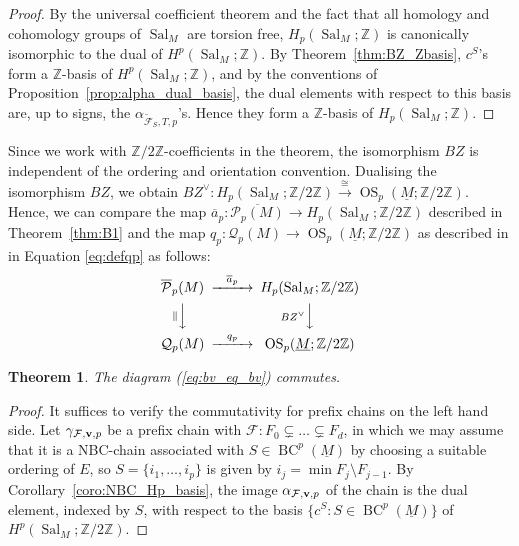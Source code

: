 \documentclass{amsart}
\newtheorem{theorem}{Theorem}[section]
\newcommand\Fcal{{\mathcal F}}
\newcommand\Qcal{{\mathcal Q}}
\newcommand\Pcal{{\mathcal P}}
\newcommand\vv{{\bf v}}
\newcommand\ZZ{{\mathbb Z}}
\newcommand\Ztwo{{\mathbb Z}/2{\mathbb Z}}
\newcommand\qbv{{q}}
\newcommand\abv{{a}}
\DeclareMathOperator{\Sal}{Sal}
\DeclareMathOperator{\OS}{OS}
\DeclareMathOperator{\BC}{BC}
\begin{document}
{\begin{proof}
By the universal coefficient theorem and the fact that all homology and cohomology groups of $\Sal_M$ are torsion free, $H_p(\Sal_M;\ZZ)$ is canonically isomorphic to the dual of $H^p(\Sal_M;\ZZ)$.
By Theorem~\ref{thm:BZ_Zbasis}, $c^S$'s form a $\ZZ$-basis of $H^p(\Sal_M;\ZZ)$, and by the conventions of Proposition~\ref{prop:alpha_dual_basis}, the dual elements with respect to this basis are, up to signs, the $\alpha_{\tilde{\Fcal}_S,T,p}$'s. Hence they form a $\ZZ$-basis of $H_p(\Sal_M;\ZZ)$.
\end{proof}

Since we work with $\Ztwo$-coefficients in the theorem, the isomorphism $BZ$ is independent of the ordering and orientation convention.
Dualising the isomorphism $BZ$, we obtain $BZ^\vee:H_p(\Sal_M;\Ztwo)\xrightarrow{\cong}\OS_p(\underline{M};\Ztwo)$.
Hence, we can compare the map $\overline{\abv}_p:\overline{\Pcal_p(M)}\rightarrow H_p(\Sal_M;\Ztwo)$ described in Theorem~\ref{thm:B1} and the map $\qbv_p:\Qcal_p(M) \rightarrow \OS_p(\underline{M};\Ztwo)$ as described in \cite[Definition 4.9]{RS} in Equation \ref{eq:defqp} as follows:
\begin{equation} \label{eq:bv_eq_bv}
\begin{CD}
\overline{\Pcal}_p(M)    @>\overline{\abv}_p>>  H_p(\Sal_M;\Ztwo)\\
@V\parallel VV        @V BZ^\vee VV\\
\Qcal_p(M)      @>\qbv_p>>  \OS_p(\underline{M};\Ztwo)
\end{CD}
\end{equation}

\begin{theorem} \label{thm:B2}
The diagram (\ref{eq:bv_eq_bv}) commutes.
\end{theorem}

\begin{proof}
It suffices to verify the commutativity for prefix chains on the left hand side.
Let $\gamma_{\Fcal,\vv,p}$ be a prefix chain with $\Fcal:F_0\subsetneq \ldots \subsetneq F_d$, in which we may assume that it is a NBC-chain associated with $S\in\BC^p(\underline{M})$ by choosing a suitable ordering of $E$, so $S=\{i_1,\ldots,i_p\}$ is given by $i_j=\min F_j\setminus F_{j-1}$.
By Corollary~\ref{coro:NBC_Hp_basis}, the image $\alpha_{\Fcal,\vv,p}$ of the chain is the dual element, indexed by $S$, with respect to the basis $\{c^S:S\in\BC^p(\underline{M})\}$ of $H^p(\Sal_M;\Ztwo)$.


\end{proof}}
\end{document}
